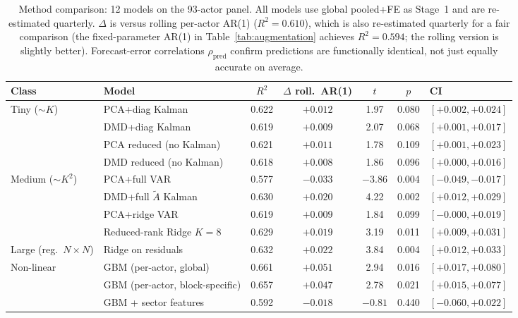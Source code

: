 \documentclass[11pt,a4paper]{article}
\begin{document}
\begin{table}[H]
\centering
\caption{Method comparison: 12 models on the 93-actor panel. All models use global pooled+FE as Stage~1 and are re-estimated quarterly. $\Delta$ is versus rolling per-actor AR(1) ($R^2 = 0.610$), which is also re-estimated quarterly for a fair comparison (the fixed-parameter AR(1) in Table~\ref{tab:augmentation} achieves $R^2 = 0.594$; the rolling version is slightly better). Forecast-error correlations $\rho_{\mathrm{pred}}$ confirm predictions are functionally identical, not just equally accurate on average.}
\label{tab:method_comparison}
\small
\begin{tabular}{llccccl}
\toprule
Class & Model & $R^2$ & $\Delta$ roll.\ AR(1) & $t$ & $p$ & CI \\
\midrule
\multirow{4}{*}{Tiny (${\sim}K$)} & PCA+diag Kalman & 0.622 & $+0.012$ & 1.97 & 0.080 & $[+0.002, +0.024]$ \\
& DMD+diag Kalman & 0.619 & $+0.009$ & 2.07 & 0.068 & $[+0.001, +0.017]$ \\
& PCA reduced (no Kalman) & 0.621 & $+0.011$ & 1.78 & 0.109 & $[+0.001, +0.023]$ \\
& DMD reduced (no Kalman) & 0.618 & $+0.008$ & 1.86 & 0.096 & $[+0.000, +0.016]$ \\
\midrule
\multirow{4}{*}{Medium (${\sim}K^2$)} & PCA+full VAR & 0.577 & $-0.033$ & $-3.86$ & 0.004 & $[-0.049, -0.017]$ \\
& DMD+full $\tilde{A}$ Kalman & 0.630 & $+0.020$ & 4.22 & 0.002 & $[+0.012, +0.029]$ \\
& PCA+ridge VAR & 0.619 & $+0.009$ & 1.84 & 0.099 & $[-0.000, +0.019]$ \\
& Reduced-rank Ridge $K{=}8$ & 0.629 & $+0.019$ & 3.19 & 0.011 & $[+0.009, +0.031]$ \\
\midrule
Large (reg.\ $N \!\times\! N$) & Ridge on residuals & 0.632 & $+0.022$ & 3.84 & 0.004 & $[+0.012, +0.033]$ \\
\midrule
\multirow{3}{*}{Non-linear} & GBM (per-actor, global) & 0.661 & $+0.051$ & 2.94 & 0.016 & $[+0.017, +0.080]$ \\
& GBM (per-actor, block-specific) & 0.657 & $+0.047$ & 2.78 & 0.021 & $[+0.015, +0.077]$ \\
& GBM + sector features & 0.592 & $-0.018$ & $-0.81$ & 0.440 & $[-0.060, +0.022]$ \\
\bottomrule
\end{tabular}


\end{table}
\end{document}
